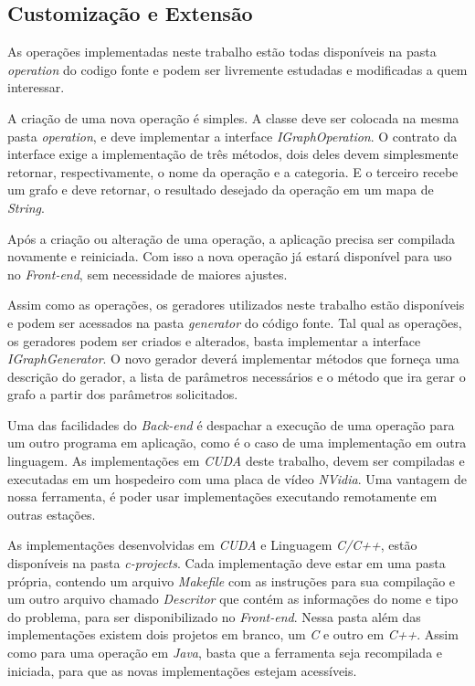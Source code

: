 \subsection{Customização e Extensão}
As operações implementadas neste trabalho
estão todas disponíveis na pasta \textit{operation} do codigo fonte
e podem ser livremente estudadas e modificadas a quem interessar.

A criação de uma nova operação é simples. A classe deve ser colocada na mesma pasta \textit{operation}, e deve implementar a interface \textit{IGraphOperation}. 
O contrato da interface exige a implementação de três métodos, dois deles devem simplesmente retornar, respectivamente, o nome da operação e a categoria. E o terceiro recebe um grafo e deve retornar, o resultado desejado da operação em um mapa de \textit{String}.

Após a criação ou alteração de uma operação, a aplicação precisa ser compilada novamente e reiniciada.
Com isso a nova operação já estará disponível para uso no \textit{Front-end},
sem necessidade de maiores ajustes.

Assim como as operações, os geradores utilizados neste trabalho estão disponíveis e podem ser acessados na pasta \textit{generator} do código fonte. Tal qual as operações, os geradores podem ser criados e alterados, basta implementar a interface \textit{IGraphGenerator}. O novo gerador deverá implementar métodos que forneça uma descrição do gerador, a lista de parâmetros necessários e o método que ira gerar o grafo a partir dos parâmetros solicitados.

Uma das facilidades do \textit{Back-end} é despachar a execução
de uma operação para um outro programa em aplicação,
como é o caso de uma implementação em outra linguagem. 
As implementações em \textit{CUDA} deste trabalho,
devem ser compiladas e executadas em um hospedeiro 
com uma placa de vídeo \textit{NVidia}. 
Uma vantagem de nossa ferramenta, é poder usar implementações executando remotamente em outras estações.

As implementações desenvolvidas em \textit{CUDA} e Linguagem \textit{C/C++}, 
estão disponíveis na pasta \textit{c-projects}. 
Cada implementação deve estar em uma pasta própria,
contendo um arquivo \textit{Makefile} com as instruções para sua compilação
e um outro arquivo chamado \textit{Descritor} que contém as informações
do nome e tipo do problema, para ser disponibilizado no \textit{Front-end}.
Nessa pasta além das implementações existem dois projetos em branco,
um \textit{C} e outro em \textit{C++}. Assim como para uma operação em \textit{Java}, 
basta que a ferramenta seja recompilada e iniciada, 
para que as novas implementações estejam acessíveis.

